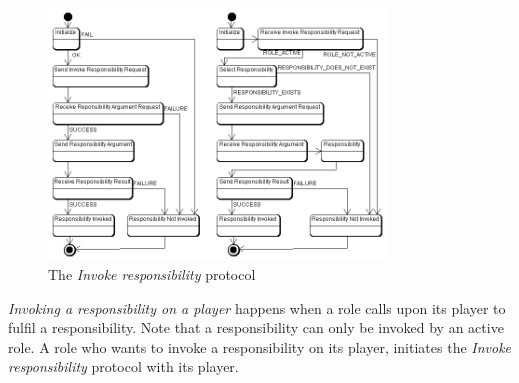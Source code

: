 \begin{figure}[ht]
	\centering
	\includegraphics[width=0.8\textwidth]{images/thespian/invoke-responsibility-protocol.png}
	\caption{The \textit{Invoke responsibility} protocol}
	\label{figure:thespian-invoke-responsibility-protocol}
\end{figure}

\textit{Invoking a responsibility on a player} happens when a role calls upon its player to fulfil a responsibility.
Note that a responsibility can only be invoked by an active role.
A role who wants to invoke a responsibility on its player, initiates the \textit{Invoke responsibility} protocol with its player.

